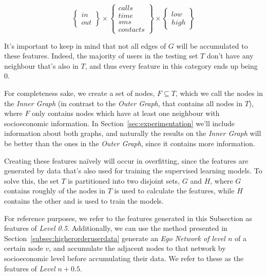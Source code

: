 \begin{equation}
\begin{Bmatrix} in \\ out \end{Bmatrix}
\times
\begin{Bmatrix} calls \\ time \\ sms \\ contacts \end{Bmatrix}
\times
\begin{Bmatrix} low \\ high \end{Bmatrix}
\label{eq:matcatuserdata}
\end{equation}

It's important to keep in mind that not all edges of $G$ will be accumulated to these features. Indeed, the majority of users in the testing set $T$ don't have any neighbour that's also in $T$, and thus every feature in this category ends up being $0$.

For completeness sake, we create a set of nodes, $F \subseteq T$, which we call the nodes in the \emph{Inner Graph} (in contrast to the \emph{Outer Graph}, that contains all nodes in $T$), where $F$ only contains nodes which have at least one neighbour with socioeconomic information. In Section~\ref{sec:experimentation} we'll include information about both graphs, and naturally the results on the \emph{Inner Graph} will be better than the ones in the \emph{Outer Graph}, since it contains more information.

Creating these features naïvely will occur in overfitting, since the features are generated by data that's also used for training the supervised learning models. To solve this, the set $T$ is partitioned into two disjoint sets, $G$ and $H$, where $G$ contains roughly  of the nodes in $T$ is used to calculate the features, while $H$ contains the other  and is used to train the models.

For reference purposes, we refer to the features generated in this Subsection as features of \emph{Level 0.5}. Additionally, we can use the method presented in Section~\ref{subsec:higherorderuserdata} generate an \emph{Ego Network of level $n$} of a certain node $v$, and accumulate the adjacent nodes to that network by socioeconomic level before accumulating their data. We refer to these as the features of \emph{Level $n + 0.5$}.
